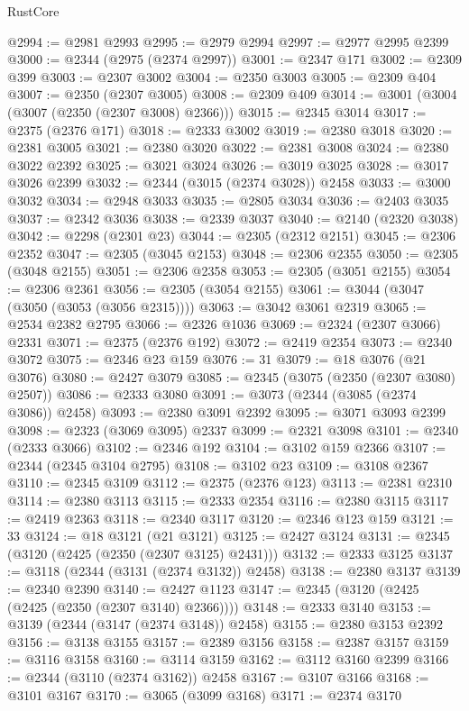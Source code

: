 \begin{lexlean}{RustCore}
\begin{coremodule}
@2994 := @2981 @2993
@2995 := @2979 @2994
@2997 := @2977 @2995 @2399
@3000 := @2344 (@2975 (@2374 @2997))
@3001 := @2347 @171
@3002 := @2309 @399
@3003 := @2307 @3002
@3004 := @2350 @3003
@3005 := @2309 @404
@3007 := @2350 (@2307 @3005)
@3008 := @2309 @409
@3014 := @3001 (@3004 (@3007 (@2350 (@2307 @3008) @2366)))
@3015 := @2345 @3014
@3017 := @2375 (@2376 @171)
@3018 := @2333 @3002
@3019 := @2380 @3018
@3020 := @2381 @3005
@3021 := @2380 @3020
@3022 := @2381 @3008
@3024 := @2380 @3022 @2392
@3025 := @3021 @3024
@3026 := @3019 @3025
@3028 := @3017 @3026 @2399
@3032 := @2344 (@3015 (@2374 @3028)) @2458
@3033 := @3000 @3032
@3034 := @2948 @3033
@3035 := @2805 @3034
@3036 := @2403 @3035
@3037 := @2342 @3036
@3038 := @2339 @3037
@3040 := @2140 (@2320 @3038)
@3042 := @2298 (@2301 @23)
@3044 := @2305 (@2312 @2151)
@3045 := @2306 @2352
@3047 := @2305 (@3045 @2153)
@3048 := @2306 @2355
@3050 := @2305 (@3048 @2155)
@3051 := @2306 @2358
@3053 := @2305 (@3051 @2155)
@3054 := @2306 @2361
@3056 := @2305 (@3054 @2155)
@3061 := @3044 (@3047 (@3050 (@3053 (@3056 @2315))))
@3063 := @3042 @3061 @2319
@3065 := @2534 @2382 @2795
@3066 := @2326 @1036
@3069 := @2324 (@2307 @3066) @2331
@3071 := @2375 (@2376 @192)
@3072 := @2419 @2354
@3073 := @2340 @3072
@3075 := @2346 @23 @159
@3076 := 31
@3079 := @18 @3076 (@21 @3076)
@3080 := @2427 @3079
@3085 := @2345 (@3075 (@2350 (@2307 @3080) @2507))
@3086 := @2333 @3080
@3091 := @3073 (@2344 (@3085 (@2374 @3086)) @2458)
@3093 := @2380 @3091 @2392
@3095 := @3071 @3093 @2399
@3098 := @2323 (@3069 @3095) @2337
@3099 := @2321 @3098
@3101 := @2340 (@2333 @3066)
@3102 := @2346 @192
@3104 := @3102 @159 @2366
@3107 := @2344 (@2345 @3104 @2795)
@3108 := @3102 @23
@3109 := @3108 @2367
@3110 := @2345 @3109
@3112 := @2375 (@2376 @123)
@3113 := @2381 @2310
@3114 := @2380 @3113
@3115 := @2333 @2354
@3116 := @2380 @3115
@3117 := @2419 @2363
@3118 := @2340 @3117
@3120 := @2346 @123 @159
@3121 := 33
@3124 := @18 @3121 (@21 @3121)
@3125 := @2427 @3124
@3131 := @2345 (@3120 (@2425 (@2350 (@2307 @3125) @2431)))
@3132 := @2333 @3125
@3137 := @3118 (@2344 (@3131 (@2374 @3132)) @2458)
@3138 := @2380 @3137
@3139 := @2340 @2390
@3140 := @2427 @1123
@3147 := @2345 (@3120 (@2425 (@2425 (@2350 (@2307 @3140) @2366))))
@3148 := @2333 @3140
@3153 := @3139 (@2344 (@3147 (@2374 @3148)) @2458)
@3155 := @2380 @3153 @2392
@3156 := @3138 @3155
@3157 := @2389 @3156
@3158 := @2387 @3157
@3159 := @3116 @3158
@3160 := @3114 @3159
@3162 := @3112 @3160 @2399
@3166 := @2344 (@3110 (@2374 @3162)) @2458
@3167 := @3107 @3166
@3168 := @3101 @3167
@3170 := @3065 (@3099 @3168)
@3171 := @2374 @3170

\end{coremodule}
\end{lexlean}
